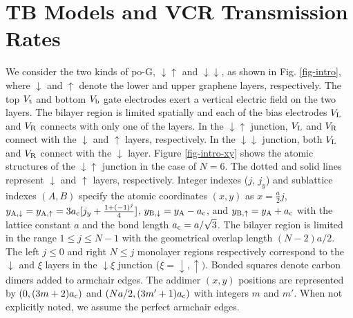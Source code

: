 \documentclass{jpsj3}
\begin{document}
\section{TB Models and  VCR Transmission Rates} 
We consider the two kinds of po-G, $\downarrow\uparrow$
and $\downarrow\downarrow$, as shown in Fig. \ref{fig-intro},  
where $\downarrow$ and $\uparrow$ denote
the lower and upper graphene layers, respectively.
The top $V_{\rm t}$ and bottom $V_{\rm b}$ gate electrodes
exert a vertical electric field on the two layers.
The bilayer region is limited spatially and each of the bias electrodes
$V_{\rm L}$ and $V_{\rm R}$
connects with only one of the layers.
In the $\downarrow\uparrow$ junction, 
$V_{\rm L}$ and $V_{\rm R}$ 
connect with
the $\downarrow$ and $\uparrow$ layers, respectively.
In the $\downarrow\downarrow$ junction, 
both $V_{\rm L}$ and $V_{\rm R}$ 
connect with
the $\downarrow$ layer.
Figure \ref{fig-intro-xy} 
 shows the atomic structures of
the $\downarrow\uparrow$ junction in the case of $N=6$.
The dotted and solid lines 
represent $\downarrow$ 
and $\uparrow$ layers, respectively.
Integer indexes ($j$, $j_y$)
and sublattice indexes $(A,B)$ specify the atomic coordinates $(x,y)$ as
$x=\frac{a}{2}j$,
$y_{\rm A,\downarrow}=y_{\rm A,\uparrow}=3 a_{\rm c} [j_y+ \frac{1+(-1)^j}{4}]$, $y_{\rm B,\downarrow}=y_{\rm A}-a_{\rm c}$,
 and $y_{\rm B,\uparrow}=y_{\rm A}+a_{\rm c}$
with the lattice constant $a$
and the bond length $a_{\rm c}=a/\sqrt{3}$. 
The bilayer region is limited in the range $1\leq j \leq N-1$
with the geometrical overlap length $(N-2)a/2$.
The left $j \leq 0$ 
and right $N \leq j$ monolayer regions respectively 
correspond to
the $\downarrow$ and $\xi$ layers in the $\downarrow\xi$ junction
($\xi= \downarrow, \uparrow)$. 
Bonded squares denote carbon dimers added to
armchair edges.
The addimer $(x,y)$ positions are represented by
$(0, (3m+2)a_{\rm c})$ and $(Na/2, (3m'+1)a_{\rm c})$ with integers $m$ and $m'$.
When not explicitly noted, we assume the
perfect armchair edges. 
\end{document}
